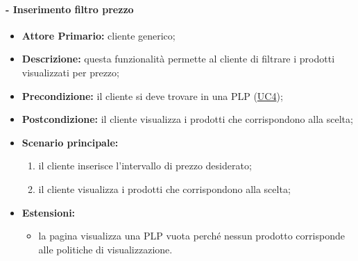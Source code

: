 \paragraph{ - Inserimento filtro prezzo}
\begin{itemize}
    \item \textbf{Attore Primario:} cliente generico;
    \item \textbf{Descrizione:} questa funzionalità permette al cliente di filtrare i prodotti visualizzati per prezzo;
    \item \textbf{Precondizione:} il cliente si deve trovare in una PLP (\hyperref[UC4]{UC4});
    \item \textbf{Postcondizione:} il cliente visualizza i prodotti che corrispondono alla scelta;
    \item \textbf{Scenario principale:}
          \begin{enumerate}
              \item il cliente inserisce l'intervallo di prezzo desiderato;
              \item il cliente visualizza i prodotti che corrispondono alla scelta;
          \end{enumerate}
    \item \textbf{Estensioni:}
          \begin{itemize}
              \item la pagina visualizza una PLP vuota perché nessun prodotto corrisponde alle politiche di visualizzazione.
          \end{itemize}
\end{itemize}

\stepsubsubUserCase
